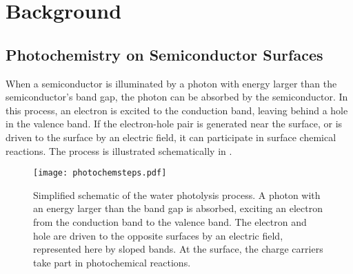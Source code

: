 
\chapter{Background}
\label{ch:background}


\section{Photochemistry on Semiconductor Surfaces}
\label{sec:background.semiconductorphotochem}

When a semiconductor is illuminated by a photon with energy larger than the semiconductor's band gap, the photon can be absorbed by the semiconductor.\cite{Morrison:1980va} In this process, an electron is excited to the conduction band, leaving behind a hole in the valence band. If the electron-hole pair is generated near the surface, or is driven to the surface by an electric field, it can participate in surface chemical reactions. The process is illustrated schematically in .

\begin{figure}
	\texttt{[image: photochemsteps.pdf]}
	\caption[Simplified schematic of the water photolysis process]{%
		Simplified schematic of the water photolysis process. A photon 
		with an energy larger than the band gap is absorbed, exciting 
		an electron from the conduction band to the valence band. The 
		electron and hole are driven to the opposite surfaces by an electric field, 
		represented here by sloped bands. At the surface, the charge 
		carriers take part in photochemical reactions.}
	\label{fig:photochemsteps}
\end{figure}

